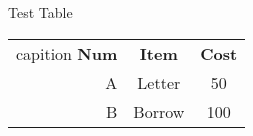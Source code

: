 Test Table

\begin{tabular}{ r c c } capition
    \textbf{Num} & \textbf{Item} & \textbf{Cost}  \\ 
    A & Letter & 50 \\
    B & Borrow & 100 \\
\end{tabular}